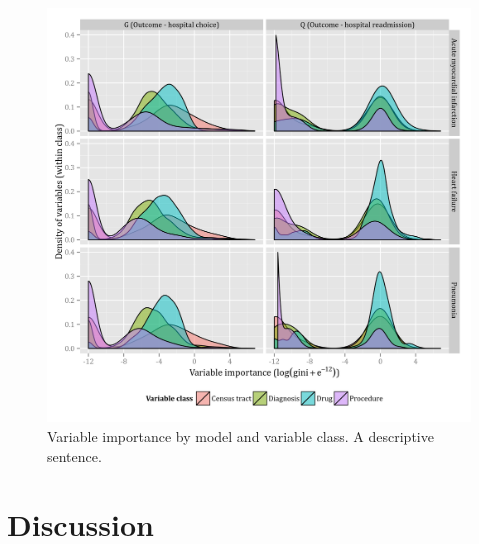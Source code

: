 \documentclass[]{article}\usepackage[]{graphicx}\usepackage[]{color}
\begin{document}
\begin{figure}[H]
    \includegraphics{../figures/variable_importance_by_model_and_class.png}
    \caption[Error rate for random forest model of hospital choice.]
      {Variable importance by model and variable class. A descriptive sentence.}
    \label{fig:variable_importance_by_model_and_class}
\end{figure}


\section{Discussion}

\printbibliography
\end{document}

